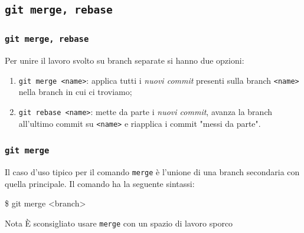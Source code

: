 \documentclass{beamer}
\begin{document}
\subsection{\texttt{git merge, rebase}}
\begin{frame}
  \frametitle{\texttt{git merge, rebase}}
  Per unire il lavoro svolto su branch separate si hanno due opzioni:
  \begin{enumerate}
    \item<1-> \texttt{git merge <name>}: applica tutti i \emph{nuovi commit}\footnotemark{}
      presenti sulla branch \texttt{<name>} nella branch in cui ci troviamo;
    \item<2-> \texttt{git rebase <name>}: mette da parte i
      \emph{nuovi commit}\footnotemark[\value{footnote}], avanza la branch
      all'ultimo commit su \texttt{<name>} e riapplica i commit "messi da parte".
  \end{enumerate}
\end{frame}

\begin{frame}
  \frametitle{\texttt{git merge}}
  Il caso d'uso tipico per il comando \texttt{merge} \`e l'unione di una branch
  secondaria con quella principale. Il comando ha la seguente sintassi:
  \begin{semiverbatim}
  \$ git merge <branch>
  \end{semiverbatim}

  \begin{figure}
  \end{figure}

  \pause
  \begin{block}{Nota}
    \`E sconsigliato usare \texttt{merge} con un spazio di lavoro sporco
  \end{block}
\end{frame}
\end{document}
